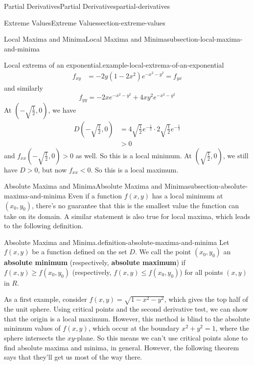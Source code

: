 \documentclass[oneside,10pt,]{book}
\newcommand{\terminology}[1]{\textbf{#1}}
\numberwithin{equation}{section}
\begin{document}
\begin{chapterptx}{Partial Derivatives}{}{Partial Derivatives}{}{}{partial-derivatives}
\begin{sectionptx}{Extreme Values}{}{Extreme Values}{}{}{section-extreme-values}
\begin{subsectionptx}{Local Maxima and Minima}{}{Local Maxima and Minima}{}{}{subsection-local-maxima-and-minima}
\begin{example}{Local extrema of an exponential.}{example-local-extrema-of-an-exponential}
\begin{align*}
f_{xy} & = -2y(1-2x^{2})e^{-x^{2} - y^{2}} = f_{yx} 
\end{align*}
and similarly%
\begin{equation*}
f_{yy} = -2xe^{-x^{2} - y^{2}} + 4xy^{2}e^{-x^{2} - y^{2}}
\end{equation*}
At \((-\sqrt{\frac{1}{2}},0)\), we have%
\begin{align*}
D\left(-\sqrt{\frac{1}{2}},0\right) & = 4\sqrt{\frac{1}{2}}e^{-\frac{1}{2}}\cdot2\sqrt{\frac{1}{2}}e^{-\frac{1}{2}}\\
& > 0 
\end{align*}
and \(f_{xx}(-\sqrt{\frac{1}{2}},0) >0\) as well. So this is a local minimum. At \((\sqrt{\frac{1}{2}},0)\), we still have \(D>0\), but now \(f_{xx}<0\). So this is a local maximum.%
\end{example}
\end{subsectionptx}
%
%
\typeout{************************************************}
\typeout{************************************************}
%
\begin{subsectionptx}{Absolute Maxima and Minima}{}{Absolute Maxima and Minima}{}{}{subsection-absolute-maxima-and-minima}
\hypertarget{p-1432}{}%
Even if a function \(f(x,y)\) has a local minimum at \((x_{0},y_{0})\), there's no guarantee that this is the smallest value the function can take on its domain. A similar statement is also true for local maxima, which leads to the following definition.%
\begin{definition}{Absolute Maxima and Minima.}{definition-absolute-maxima-and-minima}%
\hypertarget{p-1433}{}%
Let \(f(x,y)\) be a function defined on the set \(D\). We call the point \((x_{0},y_{0})\) an \terminology{absolute minimum} (respectively, \terminology{absolute maximum}) if \(f(x,y)\geq f(x_{0},y_{0})\) (respectively, \(f(x,y)\leq f(x_{0},y_{0})\)) for all points \((x,y)\) in \(R\).%
\end{definition}
\hypertarget{p-1434}{}%
As a first example, consider \(f(x,y) = \sqrt{1 - x^{2} - y^{2}}\), which gives the top half of the unit sphere. Using critical points and the second derivative test, we can show that the origin is a local maximum. However, this method is blind to the absolute minimum values of \(f(x,y)\), which occur at the boundary \(x^{2} + y^{2} = 1\), where the sphere intersects the \(xy\)-plane. So this means we can't use critical points alone to find absolute maxima and minima, in general. However, the following theorem says that they'll get us most of the way there.%

\end{subsectionptx}
\end{sectionptx}
\end{chapterptx}
\end{document}
